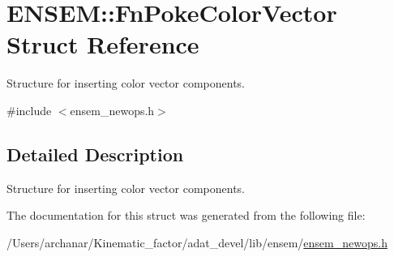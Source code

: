 \hypertarget{structENSEM_1_1FnPokeColorVector}{}\section{E\+N\+S\+EM\+:\+:Fn\+Poke\+Color\+Vector Struct Reference}
\label{structENSEM_1_1FnPokeColorVector}


Structure for inserting color vector components.  




{\ttfamily \#include $<$ensem\+\_\+newops.\+h$>$}



\subsection{Detailed Description}
Structure for inserting color vector components. 

The documentation for this struct was generated from the following file\+:\begin{DoxyCompactItemize}
\item 
/\+Users/archanar/\+Kinematic\+\_\+factor/adat\+\_\+devel/lib/ensem/\mbox{\hyperlink{lib_2ensem_2ensem__newops_8h}{ensem\+\_\+newops.\+h}}\end{DoxyCompactItemize}
